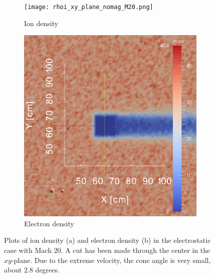 \documentclass[twoside]{article}
\begin{document}
\begin{figure}[H]
\centering
\begin{subfigure}{.5\textwidth}
  \centering
  \texttt{[image: rhoi\_xy\_plane\_nomag\_M20.png]}
  \caption{Ion density}
  \label{fig:sub11}
\end{subfigure}%
\begin{subfigure}{.5\textwidth}
  \centering
  \includegraphics[width=\linewidth]{rhoe_xy_plane_nomag_M20.png}
  \caption{Electron density}
  \label{fig:sub12}
\end{subfigure}
\caption{Plots of ion density (a) and electron density (b) in the electrostatic case with Mach 20. A cut has been made through the center in the $xy$-plane. Due to the extreme velocity, the cone angle is very small, about 2.8 degrees.}
\label{fig:1}
\end{figure}
\end{document}
